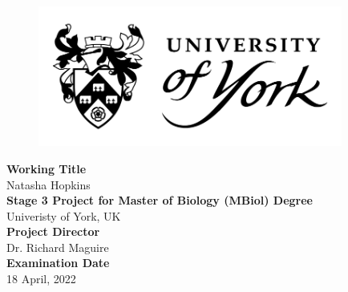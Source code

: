 \documentclass[
  12pt,
]{article}
\author{}
\date{\vspace{-2.5em}}
\begin{document}
\captionsetup{justification=raggedright,singlelinecheck=false}

\begin{center}
\begin{figure}[h!]
\centering
  \includegraphics[width=10cm]{../images/uoy_logo.png}
  \label{}
\end{figure}
\vspace*{2\baselineskip}
\Large{\textbf{Working Title}}\\
Natasha Hopkins\\
\vspace*{2\baselineskip}
\Large{\textbf{Stage 3 Project for Master of Biology (MBiol) Degree}}\\
\Large{Univeristy of York, UK}\\
\vspace*{2\baselineskip}
\Large{\textbf{Project Director}}\\
Dr. Richard Maguire\\
\vspace*{2\baselineskip}
\Large{\textbf{Examination Date}}\\
18 April, 2022
\end{center}

\hypersetup{linkcolor = black}
\newpage
\tableofcontents
\listoffigures 
\listoftables
\hypersetup{linkcolor = teal}
\end{document}
